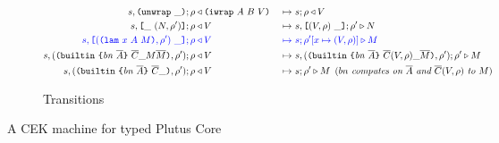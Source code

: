 \documentclass[../plutus-core-specification.tex]{subfiles}
\begin{document}
\begin{figure}[!ht]
\begin{subfigure}[c]{\linewidth}
\begin{alignat*}{2}
       s,\texttt{(} \texttt{unwrap} ~ \_ \texttt{)}{}; \rho                   &\triangleleft \texttt{(} \texttt{iwrap} ~ A ~ B ~ V \texttt{)} &~\mapsto~& s;\rho \triangleleft V\\
       s,\texttt{[} \_ ~ (N,\rho^{\prime}) \texttt{]}; \rho   &\triangleleft V &~\mapsto~& s, \texttt{[} (V,\rho) ~ \_ \texttt{]};\rho^{\prime} \triangleright N\\
       \textcolor{blue}{s,\texttt{[} (\texttt{(} \texttt{lam} ~ x ~ A ~ M \texttt{)}, \rho^{\prime}) ~ \_ \texttt{]}; \rho}
                                  &\color{blue}\triangleleft V &~\color{blue}\mapsto~& \textcolor{blue}{s;\rho^{\prime}[x\mapsto (V,\rho)] \triangleright M}\\
       s,  (\texttt{(} \texttt{builtin} ~ \texttt{\{} \mathit{bn} ~ \overline{A} \texttt{\}} ~ \overline{C} \_ M \overline{M} \texttt{)}{}, \rho^{\prime}); \rho
                                  &\triangleleft V &~\mapsto~& s, (\texttt{(} \texttt{builtin} ~ \texttt{\{} \mathit{bn} ~ \overline{A} \texttt{\}} ~ \overline{C}(V,\rho) \_ \overline{M} \texttt{)}, \rho^{\prime});\rho^{\prime} \triangleright M\\
       s,(\texttt{(} \texttt{builtin} ~ \texttt{\{} \mathit{bn} ~ \overline{A} \texttt{\}} ~ \overline{C} \_  \texttt{)}, \rho^{\prime}); \rho&\triangleleft V 
                                                  &~\mapsto~& s;\rho^{\prime} \triangleright M \enspace (\textit{$bn$ computes on $\overline{A}$ and $\overline{C}(V,\rho)$ to $M$})\\
\end{alignat*}
\caption{Transitions}
\end{subfigure}
\caption{A CEK machine for typed Plutus Core}
\label{fig:cek-machine}
\end{figure}
\end{document}

